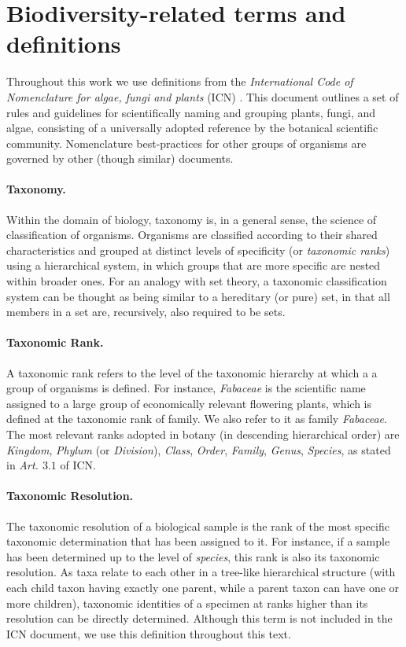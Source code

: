\section{Biodiversity-related terms and definitions} \label{section:biodiversity_terms}

Throughout this work we use definitions from the \textit{International Code of Nomenclature for algae, fungi and plants} (ICN) \cite{McNeill2012}. This document outlines a set of rules and guidelines for scientifically naming and grouping plants, fungi, and algae, consisting of a universally adopted reference by the botanical scientific community. Nomenclature best-practices for other groups of organisms are governed by other (though similar) documents.

\paragraph*{Taxonomy.}
Within the domain of biology, taxonomy is, in a general sense, the science of classification of organisms. 
Organisms are classified according to their shared characteristics and grouped at distinct levels of specificity (or \textit{taxonomic ranks}) using a hierarchical system, in which groups that are more specific are nested within broader ones.
For an analogy with set theory, a taxonomic classification system can be thought as being similar to a hereditary (or pure) set, in that all members in a set are, recursively, also required to be sets.

\paragraph*{Taxonomic Rank.}
A taxonomic rank refers to the level of the taxonomic hierarchy at which a a group of organisms is defined.
For instance, \textit{Fabaceae} is the scientific name assigned to a large group of economically relevant flowering plants, which is defined at the taxonomic rank of family. We also refer to it as family \textit{Fabaceae}.
The most relevant ranks adopted in botany (in descending hierarchical order) are \textit{Kingdom}, \textit{Phylum} (or \textit{Division}), \textit{Class}, \textit{Order}, \textit{Family}, \textit{Genus}, \textit{Species}, as stated in \textit{Art. $3.1$} of ICN.

\paragraph*{Taxonomic Resolution.}
The taxonomic resolution of a biological sample is the rank of the most specific taxonomic determination that has been assigned to it.
For instance, if a sample has been determined up to the level of \textit{species}, this rank is also its taxonomic resolution.
As taxa relate to each other in a tree-like hierarchical structure (with each child taxon having exactly one parent, while a parent taxon can have one or more children), taxonomic identities of a specimen at ranks higher than its resolution can be directly determined.
Although this term is not included in the ICN document, we use this definition throughout this text.

